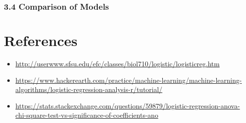 \documentclass[]{article}
\providecommand{\tightlist}{%
  \setlength{\itemsep}{0pt}\setlength{\parskip}{0pt}}
\begin{document}
\subsubsection{3.4 Comparison of Models}\label{comparison-of-models}

\section{References}\label{references}

\begin{itemize}
\tightlist
\item
  \url{http://userwww.sfsu.edu/efc/classes/biol710/logistic/logisticreg.htm}
\item
  \url{https://www.hackerearth.com/practice/machine-learning/machine-learning-algorithms/logistic-regression-analysis-r/tutorial/}
\item
  \url{https://stats.stackexchange.com/questions/59879/logistic-regression-anova-chi-square-test-vs-significance-of-coefficients-ano}
\end{itemize}
\end{document}
